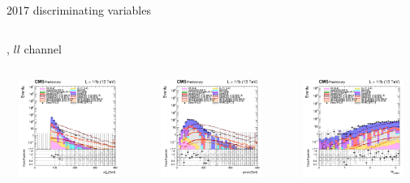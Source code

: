 \documentclass[8pt]{beamer}
\begin{document}
\begin{frame}{2017 discriminating variables}
\begin{columns}
\begin{column}{1.09\textwidth}
\begin{block}{, $ll$ channel}\end{block}\vspace{10pt}
\end{column}
\end{columns} \vspace{-5pt}
\begin{columns}
		\begin{column}{0.33\textwidth}
			\begin{center}
     			\includegraphics[width=1.0\textwidth, height=90pt]{figs/2017/log_cratio_topCR_ll_mt2ll.png}
    		\end{center}		
		\end{column} 
		\begin{column}{0.33\textwidth}
			\begin{center}
     			\includegraphics[width=1.0\textwidth, height=90pt]{figs/2017/log_cratio_topCR_ll_METcorrected_pt.png}
    		\end{center}		
		\end{column} 
		\begin{column}{0.33\textwidth}
			\begin{center}
     			\includegraphics[width=1.0\textwidth, height=90pt]{figs/2017/log_cratio_topCR_ll_dphillmet.png}

\end{center}
\end{column}
\end{columns}
\end{frame}
\end{document}
